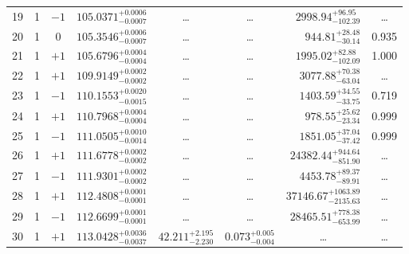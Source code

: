 \begin{table*}[!]
\begin{tabular}{llcrrlrc}
19 & 1 & $-1$ & $    105.0371_{-      0.0007}^{+      0.0006}$ & \multicolumn{1}{c}{\dots} & \multicolumn{1}{c}{\dots} & $     2998.94_{-      102.39}^{+       96.95}$ & \dots \\[1pt]
20 & 1 & 0 & $    105.3546_{-      0.0007}^{+      0.0006}$ & \multicolumn{1}{c}{\dots} & \multicolumn{1}{c}{\dots} & $      944.81_{-       30.14}^{+       28.48}$ & 0.935\\[1pt]
21 & 1 & $+1$ & $    105.6796_{-      0.0004}^{+      0.0004}$ & \multicolumn{1}{c}{\dots} & \multicolumn{1}{c}{\dots} & $     1995.02_{-      102.09}^{+       82.88}$ & 1.000\\[1pt]

22 & 1 & $+1$ & $    109.9149_{-      0.0002}^{+      0.0002}$ & \multicolumn{1}{c}{\dots} & \multicolumn{1}{c}{\dots} & $     3077.88_{-       63.04}^{+       70.38}$ & \dots \\[1pt]
23 & 1 & $-1$ & $    110.1553_{-      0.0015}^{+      0.0020}$ & \multicolumn{1}{c}{\dots} & \multicolumn{1}{c}{\dots} & $     1403.59_{-       33.75}^{+       34.55}$ & 0.719\\[1pt]
24 & 1 & $+1$ & $    110.7968_{-      0.0004}^{+      0.0004}$ & \multicolumn{1}{c}{\dots} & \multicolumn{1}{c}{\dots} & $      978.55_{-       23.34}^{+       25.62}$ & 0.999\\[1pt]
25 & 1 & $-1$ & $    111.0505_{-      0.0014}^{+      0.0010}$ & \multicolumn{1}{c}{\dots} & \multicolumn{1}{c}{\dots} & $     1851.05_{-       37.42}^{+       37.04}$ & 0.999\\[1pt]
26 & 1 & $+1$ & $    111.6778_{-      0.0002}^{+      0.0002}$ & \multicolumn{1}{c}{\dots} & \multicolumn{1}{c}{\dots} & $    24382.44_{-      851.90}^{+      944.64}$ & \dots\\[1pt]
27 & 1 & $-1$ & $    111.9301_{-      0.0002}^{+      0.0002}$ & \multicolumn{1}{c}{\dots} & \multicolumn{1}{c}{\dots} & $     4453.78_{-       89.91}^{+       89.37}$ & \dots\\[1pt]
28 & 1 & $+1$ & $    112.4808_{-      0.0001}^{+      0.0001}$ & \multicolumn{1}{c}{\dots} & \multicolumn{1}{c}{\dots} & $    37146.67_{-     2135.63}^{+     1063.89}$ & \dots\\[1pt]
29 & 1 & $-1$ & $    112.6699_{-      0.0001}^{+      0.0001}$ & \multicolumn{1}{c}{\dots} & \multicolumn{1}{c}{\dots} & $    28465.51_{-      653.99}^{+      778.38}$ & \dots\\[1pt]
30 & 1 & $+1$ & $    113.0428_{-      0.0037}^{+      0.0036}$ & $      42.211_{-       2.230}^{+       2.195}$ & $       0.073_{-       0.004}^{+       0.005}$ & \multicolumn{1}{c}{\dots} & \dots \\[1pt]

\end{tabular}
\end{table*}

